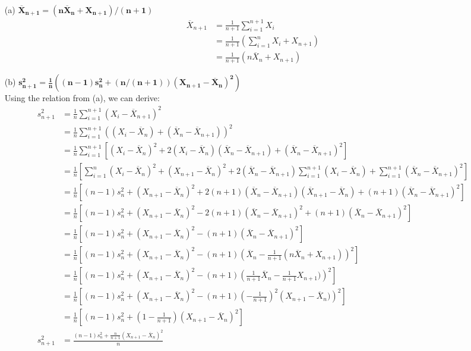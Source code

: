 \documentclass{article}
\newcommand{\olx}[1]{\overline{X}_{#1}}
\begin{document}
\begin{itemize}
	\item[(a)] $\mathbf{\overline{X}_{n+1}=(n\overline{X}_n + X_{n+1})/(n+1)}$ \\
		\begin{align*}
			\overline{X}_{n+1} 	&= \frac{1}{n+1}\sum_{i=1}^{n+1}X_i 	\\
								&= \frac{1}{n+1}\left(\sum_{i=1}^nX_i + X_{n+1}\right)	\\
								&= \frac{1}{n+1}\left(n\overline{X}_n + X_{n+1}\right)
		\end{align*}
	
	\item[(b)] $\mathbf{s^2_{n+1}=\frac{1}{n}((n-1)s_n^2+(n/(n+1))(X_{n+1}-\overline{X}_n)^2)}$ \\
	
		Using the relation from (a), we can derive:
		\begin{align*}
			s^2_{n+1} 	&= \frac{1}{n}\sum_{i=1}^{n+1}(X_i-\overline{X}_{n+1})^2 	\\
						&= \frac{1}{n}\sum_{i=1}^{n+1}\left((X_i-\olx{n})+(\olx{n}-\olx{n+1})\right)^2	\\
						&= \frac{1}{n}\sum_{i=1}^{n+1}\left[(X_i-\olx{n})^2+2(X_i-\olx{n})(\olx{n}-\olx{n+1})+(\olx{n}-\olx{n+1})^2\right]	\\
						&= \frac{1}{n}\left[\sum_{i=1}^{n}(X_i-\olx{n})^2 + (X_{n+1}-\olx{n})^2 +2(\olx{n}-\olx{n+1})\sum_{i=1}^{n+1}(X_i-\olx{n})
						+\sum_{i=1}^{n+1}(\olx{n}-\olx{n+1})^2\right]	\\
						&= \frac{1}{n}\left[(n-1)s^2_n + (X_{n+1}-\olx{n})^2 +2(n+1)(\olx{n}-\olx{n+1})(\olx{n+1}-\olx{n}) +(n+1)(\olx{n}-\olx{n+1})^2\right]	\\
						&= \frac{1}{n}\left[(n-1)s^2_n + (X_{n+1}-\olx{n})^2 -2(n+1)(\olx{n}-\olx{n+1})^2 +(n+1)(\olx{n}-\olx{n+1})^2\right]	\\
						&= \frac{1}{n}\left[(n-1)s^2_n + (X_{n+1}-\olx{n})^2 -(n+1)(\olx{n}-\olx{n+1})^2 \right]	\\
						&= \frac{1}{n}\left[(n-1)s^2_n + (X_{n+1}-\olx{n})^2 -(n+1)\left(\olx{n}-\frac{1}{n+1}(n\olx{n}+X_{n+1})\right)^2 \right]	\\
						&= \frac{1}{n}\left[(n-1)s^2_n + (X_{n+1}-\olx{n})^2 -(n+1)\left(\frac{1}{n+1}\olx{n}-\frac{1}{n+1}X_{n+1})\right)^2 \right]	\\
						&= \frac{1}{n}\left[(n-1)s^2_n + (X_{n+1}-\olx{n})^2 -(n+1)\left(-\frac{1}{n+1}\right)^2\left(X_{n+1}-\olx{n})\right)^2 \right]	\\
						&= \frac{1}{n}\left[(n-1)s^2_n + \left(1-\frac{1}{n+1}\right)(X_{n+1}-\olx{n})^2 \right]	\\
			s^2_{n+1} 	&= \frac{(n-1)s^2_n + \frac{n}{n+1}(X_{n+1}-\olx{n})^2}{n}
		\end{align*}
	
\end{itemize}	
\end{document}
